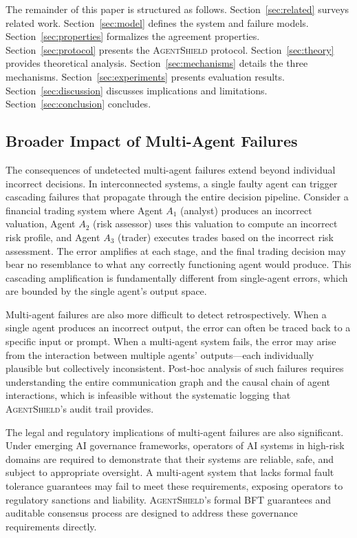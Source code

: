 \documentclass[journal,10pt]{IEEEtran}
\begin{document}
The remainder of this paper is structured as follows. Section~\ref{sec:related} surveys related work. Section~\ref{sec:model} defines the system and failure models. Section~\ref{sec:properties} formalizes the agreement properties. Section~\ref{sec:protocol} presents the \textsc{AgentShield} protocol. Section~\ref{sec:theory} provides theoretical analysis. Section~\ref{sec:mechanisms} details the three mechanisms. Section~\ref{sec:experiments} presents evaluation results. Section~\ref{sec:discussion} discusses implications and limitations. Section~\ref{sec:conclusion} concludes.

\subsection{Broader Impact of Multi-Agent Failures}
The consequences of undetected multi-agent failures extend beyond individual incorrect decisions. In interconnected systems, a single faulty agent can trigger cascading failures that propagate through the entire decision pipeline. Consider a financial trading system where Agent $A_1$ (analyst) produces an incorrect valuation, Agent $A_2$ (risk assessor) uses this valuation to compute an incorrect risk profile, and Agent $A_3$ (trader) executes trades based on the incorrect risk assessment. The error amplifies at each stage, and the final trading decision may bear no resemblance to what any correctly functioning agent would produce. This cascading amplification is fundamentally different from single-agent errors, which are bounded by the single agent's output space.

Multi-agent failures are also more difficult to detect retrospectively. When a single agent produces an incorrect output, the error can often be traced back to a specific input or prompt. When a multi-agent system fails, the error may arise from the interaction between multiple agents' outputs---each individually plausible but collectively inconsistent. Post-hoc analysis of such failures requires understanding the entire communication graph and the causal chain of agent interactions, which is infeasible without the systematic logging that \textsc{AgentShield}'s audit trail provides.

The legal and regulatory implications of multi-agent failures are also significant. Under emerging AI governance frameworks, operators of AI systems in high-risk domains are required to demonstrate that their systems are reliable, safe, and subject to appropriate oversight. A multi-agent system that lacks formal fault tolerance guarantees may fail to meet these requirements, exposing operators to regulatory sanctions and liability. \textsc{AgentShield}'s formal BFT guarantees and auditable consensus process are designed to address these governance requirements directly.
\end{document}
